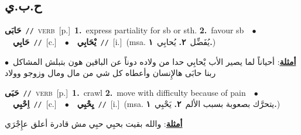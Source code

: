 \documentclass[10pt,a4paper,twoside]{article} %
\begin{document}
\begin{multicols}{2}
\vspace{-3mm}
\subsection*{\color{blue}\foreignlanguage{arabic}{ح.ب.ي}\color{blue}{}} 

{\setlength\topsep{0pt}\textbf{\foreignlanguage{arabic}{حَابَى}}\ {\color{gray}\texttt{//}\color{black}}\ \textsc{verb}\ [p.]\ \textbf{1.}~express partiality for sb or sth.  \textbf{2.}~favour sb\ \ $\bullet$\ \ \setlength\topsep{0pt}\textbf{\foreignlanguage{arabic}{حَابِي}}\ {\color{gray}\texttt{//}\color{black}}\ [c.]\ \ $\bullet$\ \ \setlength\topsep{0pt}\textbf{\foreignlanguage{arabic}{يْحَابِي}}\ {\color{gray}\texttt{//}\color{black}}\ [i.]\ \color{gray}(msa. \foreignlanguage{arabic}{يُفَضِّل}~\foreignlanguage{arabic}{\textbf{٢.}}  \foreignlanguage{arabic}{يُحابِي}~\foreignlanguage{arabic}{\textbf{١.}})\color{black}\  \begin{flushright}\color{gray}\foreignlanguage{arabic}{\textbf{\underline{\foreignlanguage{arabic}{أمثلة}}}: أحياناً لما يصير الأب يْحابِي حدا من ولاده دوناً عن الباقين هون بتبلش المشاكل\ $\bullet$\ \  ربنا حابَى هالإِنسان وأعطاه كل شي من مال ومال وزوجو وولاد}\end{flushright}\color{black}} \vspace{2mm}

{\setlength\topsep{0pt}\textbf{\foreignlanguage{arabic}{حَبَى}}\ {\color{gray}\texttt{//}\color{black}}\ \textsc{verb}\ [p.]\ \textbf{1.}~crawl  \textbf{2.}~move with difficulty because of pain\ \ $\bullet$\ \ \setlength\topsep{0pt}\textbf{\foreignlanguage{arabic}{اِحْبِي}}\ {\color{gray}\texttt{//}\color{black}}\ [c.]\ \ $\bullet$\ \ \setlength\topsep{0pt}\textbf{\foreignlanguage{arabic}{يِحْبِي}}\ {\color{gray}\texttt{//}\color{black}}\ [i.]\ \color{gray}(msa. \foreignlanguage{arabic}{يتحرَّك بصعوبة بسبب الألم}~\foreignlanguage{arabic}{\textbf{٢.}}  \foreignlanguage{arabic}{يَحْبِي}~\foreignlanguage{arabic}{\textbf{١.}})\color{black}\  \begin{flushright}\color{gray}\foreignlanguage{arabic}{\textbf{\underline{\foreignlanguage{arabic}{أمثلة}}}: والله بقيت بحبِي حبِي مش قادرة أعلق عإِجْرَي}\end{flushright}\color{black}} \vspace{2mm}


\end{multicols}
\end{document}
